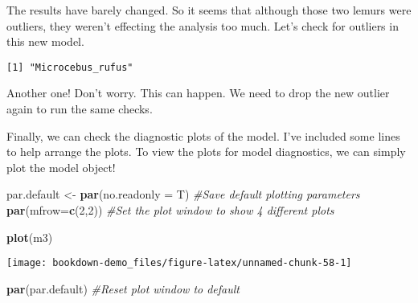 \documentclass[]{book}
\newenvironment{Shaded}{\begin{snugshade}}{\end{snugshade}}
\newcommand{\KeywordTok}[1]{\textcolor[rgb]{0.13,0.29,0.53}{\textbf{#1}}}
\newcommand{\DataTypeTok}[1]{\textcolor[rgb]{0.13,0.29,0.53}{#1}}
\newcommand{\DecValTok}[1]{\textcolor[rgb]{0.00,0.00,0.81}{#1}}
\newcommand{\StringTok}[1]{\textcolor[rgb]{0.31,0.60,0.02}{#1}}
\newcommand{\CommentTok}[1]{\textcolor[rgb]{0.56,0.35,0.01}{\textit{#1}}}
\newcommand{\OtherTok}[1]{\textcolor[rgb]{0.56,0.35,0.01}{#1}}
\newcommand{\OperatorTok}[1]{\textcolor[rgb]{0.81,0.36,0.00}{\textbf{#1}}}
\newcommand{\NormalTok}[1]{#1}
\begin{document}
The results have barely changed. So it seems that although those two
lemurs were outliers, they weren't effecting the analysis too much.
Let's check for outliers in this new model.

\begin{Shaded}
\end{Shaded}

\begin{verbatim}
[1] "Microcebus_rufus"
\end{verbatim}

Another one! Don't worry. This can happen. We need to drop the new
outlier again to run the same checks.

Finally, we can check the diagnostic plots of the model. I've included
some lines to help arrange the plots. To view the plots for model
diagnostics, we can simply plot the model object!

\begin{Shaded}
\begin{Highlighting}[]
\NormalTok{par.default <-}\StringTok{ }\KeywordTok{par}\NormalTok{(}\DataTypeTok{no.readonly =}\NormalTok{ T) }\CommentTok{#Save default plotting parameters}
\KeywordTok{par}\NormalTok{(}\DataTypeTok{mfrow=}\KeywordTok{c}\NormalTok{(}\DecValTok{2}\NormalTok{,}\DecValTok{2}\NormalTok{)) }\CommentTok{#Set the plot window to show 4 different plots}

\KeywordTok{plot}\NormalTok{(m3)}
\end{Highlighting}
\end{Shaded}

\begin{center}\texttt{[image: bookdown-demo\_files/figure-latex/unnamed-chunk-58-1]} \end{center}

\begin{Shaded}
\begin{Highlighting}[]
\KeywordTok{par}\NormalTok{(par.default) }\CommentTok{#Reset plot window to default}
\end{Highlighting}
\end{Shaded}
\end{document}
